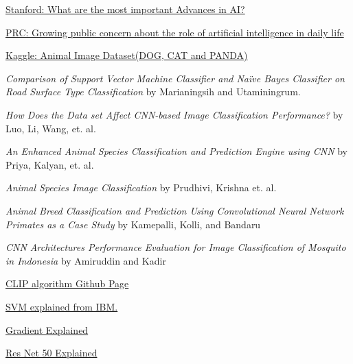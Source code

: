 \documentclass[a4paper,10pt]{article}
\begin{document}
  \begin{thebibliography}{}

     \href{https://ai100.stanford.edu/gathering-strength-gathering-storms-one-hundred-year-study-artificial-intelligence-ai100-2021-1/sq2#:~:text=In%20the%20last%20five%20years,and%20integration%20of%20vision%20and}{Stanford: What are the most important Advances in AI?}

     \href{https://www.pewresearch.org/short-reads/2023/08/28/growing-public-concern-about-the-role-of-artificial-intelligence-in-daily-life/}{PRC: Growing public concern about the role of artificial intelligence in daily life}
  
     \href{https://www.kaggle.com/datasets/ashishsaxena2209/animal-image-datasetdog-cat-and-panda}{Kaggle: Animal Image Dataset(DOG, CAT and PANDA)}

     \emph{Comparison of Support Vector Machine Classifier and Naïve Bayes Classifier on Road Surface Type Classification} by Marianingsih and Utaminingrum.

     \emph{How Does the Data set Affect CNN-based Image Classification Performance?} by Luo, Li, Wang, et. al.

     \emph{An Enhanced Animal Species Classification and Prediction Engine using CNN} by Priya, Kalyan, et. al.
  
     \emph{Animal Species Image Classification} by Prudhivi, Krishna et. al.

     \emph{Animal Breed Classification and Prediction Using Convolutional Neural Network Primates as a Case Study} by Kamepalli, Kolli, and Bandaru

     \emph{CNN Architectures Performance Evaluation for Image Classification of Mosquito in Indonesia} by Amiruddin and Kadir

     \href{https://github.com/openai/CLIP/tree/main}{CLIP algorithm Github Page}

     \href{https://www.ibm.com/docs/en/spss-modeler/saas?topic=models-how-svm-works}{SVM explained from IBM.}

     \href{https://machinelearningmastery.com/gradient-in-machine-learning/}{Gradient Explained}

     \href{https://viso.ai/deep-learning/resnet-residual-neural-network/}{Res Net 50 Explained}

    

  \end{thebibliography}
\end{document}
